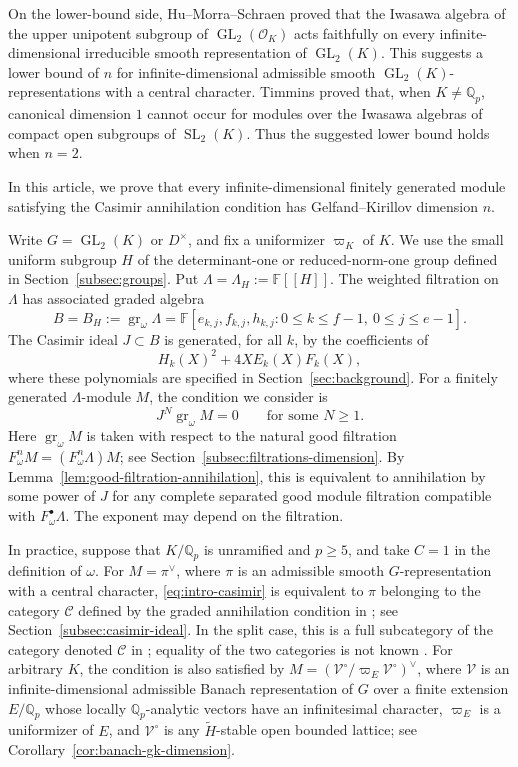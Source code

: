 \documentclass[11pt]{article}
\numberwithin{equation}{section}
\theoremstyle{definition}
\theoremstyle{remark}
\newcommand{\F}{\mathbb F}
\newcommand{\Q}{\mathbb Q}
\newcommand{\cO}{\mathcal O}
\DeclareMathOperator{\GL}{GL}
\DeclareMathOperator{\SL}{SL}
\DeclareMathOperator{\gr}{gr}
\begin{document}
On the lower-bound side, Hu--Morra--Schraen \cite{HMS14} proved that
the Iwasawa algebra of the upper unipotent subgroup of
$\GL_2(\cO_K)$ acts faithfully on every infinite-dimensional
irreducible smooth representation of $\GL_2(K)$. This suggests a
lower bound of $n$ for infinite-dimensional admissible smooth
$\GL_2(K)$-representations with a central character. Timmins
\cite{Tim26} proved that, when $K\ne\Q_p$, canonical dimension $1$
cannot occur for modules over the Iwasawa algebras of compact open
subgroups of $\SL_2(K)$. Thus the suggested lower bound holds
when $n=2$.

In this article, we prove that every infinite-dimensional finitely generated
module satisfying the Casimir annihilation condition has
Gelfand--Kirillov dimension $n$. 

Write $G=\GL_2(K)$ or $D^\times$, and fix a uniformizer $\varpi_K$
of $K$. We use the small uniform subgroup $H$ of the determinant-one
or reduced-norm-one group defined in Section~\ref{subsec:groups}.
Put $\Lambda=\Lambda_H:=\F[[H]]$. The weighted filtration on $\Lambda$
has associated graded algebra
\[
 B=B_H:=\gr_\omega\Lambda
   =\F[e_{k,j},f_{k,j},h_{k,j}:0\leq k\leq f-1,\ 0\leq j\leq e-1].
\]
The Casimir ideal $J\subset B$ is generated, for all $k$, by
the coefficients of
\[
 H_k(X)^2+4X E_k(X)F_k(X),
\]
where these polynomials are specified in
Section~\ref{sec:background}.
For a finitely generated $\Lambda$-module $M$, the condition
we consider is
\begin{equation}\label{eq:intro-casimir}
 J^N\gr_\omega M=0
 \qquad\text{for some }N\geq1.
\end{equation}
Here $\gr_\omega M$ is taken with respect to the natural good filtration
$F_\omega^nM=(F_\omega^n\Lambda)M$; see
Section~\ref{subsec:filtrations-dimension}. By
Lemma~\ref{lem:good-filtration-annihilation}, 
this is equivalent to annihilation by some power of $J$ for any
complete separated good module filtration compatible with
$F_\omega^\bullet\Lambda$. The exponent may depend on the filtration.

In practice, suppose that $K/\Q_p$ is unramified and $p\geq5$,
and take $C=1$ in the definition of $\omega$. For $M=\pi^\vee$,
where $\pi$ is an admissible smooth $G$-representation with a
central character, \eqref{eq:intro-casimir} is equivalent to
$\pi$ belonging to the category $\mathcal C$ defined by the graded
annihilation condition in \cite[\S~1]{Sor26a}; see
Section~\ref{subsec:casimir-ideal}. In the split case, this is a full
subcategory of the category denoted $\mathcal C$ in \cite{BHH25};
equality of the two categories is not known \cite[Warning~1]{Sor26a}.
For arbitrary $K$, the condition is also satisfied by
$M=(\mathcal V^\circ/\varpi_E\mathcal V^\circ)^\vee$, where
$\mathcal V$ is an infinite-dimensional admissible Banach
representation of $G$ over a finite extension $E/\Q_p$ whose
locally $\Q_p$-analytic vectors have an infinitesimal character,
$\varpi_E$ is a uniformizer of $E$, and $\mathcal V^\circ$ is any
$\widetilde H$-stable open bounded lattice; see
Corollary~\ref{cor:banach-gk-dimension}.
\end{document}
